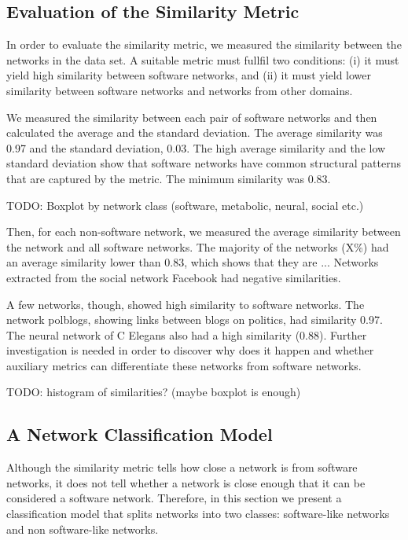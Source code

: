 
\subsection{Evaluation of the Similarity Metric}

In order to evaluate the similarity metric, we measured the similarity between
the networks in the data set. A suitable metric must fullfil two conditions: (i)
it must yield high similarity between software networks, and (ii) it must yield
lower similarity between software networks and networks from other domains.

We measured the similarity between each pair of software networks and then
calculated the average and the standard deviation. The average similarity was
0.97 and the standard deviation, 0.03. The high average similarity and the low
standard deviation show that software networks have common structural patterns
that are captured by the metric. The minimum similarity was 0.83.

TODO: Boxplot by network class (software, metabolic, neural, social etc.)

Then, for each non-software network, we measured the average similarity between
the network and all software networks. The majority of the networks (X\%) had an
average similarity lower than 0.83, which shows that they are ... Networks
extracted from the social network Facebook had negative similarities.

A few networks, though, showed high similarity to software networks. The network
polblogs, showing links between blogs on politics, had similarity 0.97. The
neural network of C Elegans also had a high similarity (0.88). Further
investigation is needed in order to discover why does it happen and whether
auxiliary metrics can differentiate these networks from software networks.

TODO: histogram of similarities? (maybe boxplot is enough)

\subsection{A Network Classification Model}

Although the similarity metric tells how close a network is from software
networks, it does not tell whether a network is close enough that it can be
considered a software network. Therefore, in this section we present a
classification model that splits networks into two classes: software-like
networks and non software-like networks.

